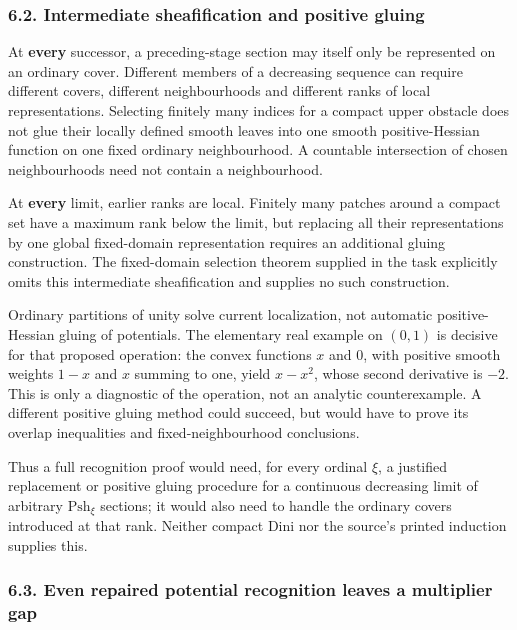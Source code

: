 \documentclass[
  11pt,
]{article}
\begin{document}
\subsubsection{6.2. Intermediate sheafification and positive
gluing}\label{intermediate-sheafification-and-positive-gluing}

At \textbf{every} successor, a preceding-stage section may itself only
be represented on an ordinary cover. Different members of a decreasing
sequence can require different covers, different neighbourhoods and
different ranks of local representations. Selecting finitely many
indices for a compact upper obstacle does not glue their locally defined
smooth leaves into one smooth positive-Hessian function on one fixed
ordinary neighbourhood. A countable intersection of chosen
neighbourhoods need not contain a neighbourhood.

At \textbf{every} limit, earlier ranks are local. Finitely many patches
around a compact set have a maximum rank below the limit, but replacing
all their representations by one global fixed-domain representation
requires an additional gluing construction. The fixed-domain selection
theorem supplied in the task explicitly omits this intermediate
sheafification and supplies no such construction.

Ordinary partitions of unity solve current localization, not automatic
positive-Hessian gluing of potentials. The elementary real example on
\((0,1)\) is decisive for that proposed operation: the convex functions
\(x\) and \(0\), with positive smooth weights \(1-x\) and \(x\) summing
to one, yield \(x-x^2\), whose second derivative is \(-2\). This is only
a diagnostic of the operation, not an analytic counterexample. A
different positive gluing method could succeed, but would have to prove
its overlap inequalities and fixed-neighbourhood conclusions.

Thus a full recognition proof would need, for every ordinal \(\xi\), a
justified replacement or positive gluing procedure for a continuous
decreasing limit of arbitrary \(\mathrm{Psh}_\xi\) sections; it would
also need to handle the ordinary covers introduced at that rank. Neither
compact Dini nor the source's printed induction supplies this.

\subsubsection{6.3. Even repaired potential recognition leaves a
multiplier
gap}\label{even-repaired-potential-recognition-leaves-a-multiplier-gap}
\end{document}
